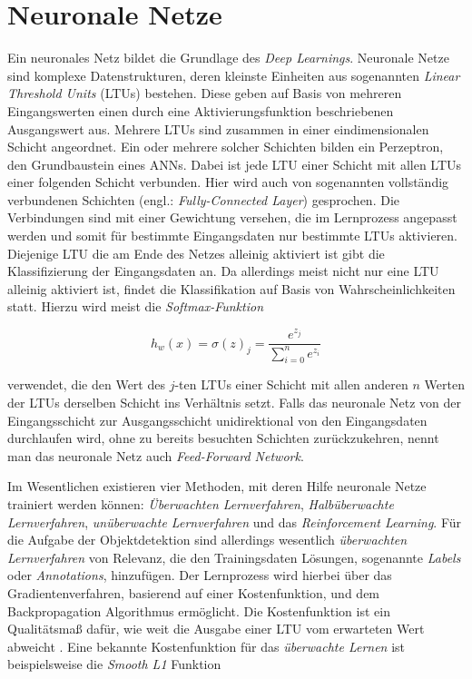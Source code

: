 \section{Neuronale Netze} \label{anns}

Ein neuronales Netz bildet die Grundlage des \textit{Deep Learnings}. Neuronale Netze sind komplexe Datenstrukturen, deren kleinste Einheiten aus sogenannten \textit{Linear Threshold Units} (LTUs) bestehen. Diese geben auf Basis von mehreren Eingangswerten einen durch eine Aktivierungsfunktion beschriebenen Ausgangswert aus. Mehrere LTUs sind zusammen in einer eindimensionalen Schicht angeordnet. Ein oder mehrere solcher Schichten bilden ein Perzeptron, den Grundbaustein eines ANNs. Dabei ist jede LTU einer Schicht mit allen LTUs einer folgenden Schicht verbunden. Hier wird auch von sogenannten vollständig verbundenen Schichten (engl.: \textit{Fully-Connected Layer}) gesprochen. Die Verbindungen sind mit einer Gewichtung versehen, die im Lernprozess angepasst werden und somit für bestimmte Eingangsdaten nur bestimmte LTUs aktivieren. Diejenige LTU die am Ende des Netzes alleinig aktiviert ist gibt die Klassifizierung der Eingangsdaten an. Da allerdings meist nicht nur eine LTU alleinig aktiviert ist, findet die Klassifikation auf Basis von Wahrscheinlichkeiten statt. Hierzu wird meist die \textit{Softmax-Funktion}

\begin{equation} \label{softmax}
h_{w}(x) = \sigma(z)_j = \frac{e^{z_j}}{\sum_{i=0}^n e^{z_i} }
\end{equation}

verwendet, die den Wert des $j$-ten LTUs einer Schicht mit allen anderen $n$ Werten der LTUs derselben Schicht ins Verhältnis setzt. Falls das neuronale Netz von der Eingangsschicht zur Ausgangsschicht unidirektional von den Eingangsdaten durchlaufen wird, ohne zu bereits besuchten Schichten zurückzukehren, nennt man das neuronale Netz auch \textit{Feed-Forward Network}.

Im Wesentlichen existieren vier Methoden, mit deren Hilfe neuronale Netze trainiert werden können: \textit{Überwachten Lernverfahren}, \textit{Halbüberwachte Lernverfahren}, \textit{unüberwachte Lernverfahren} und das \textit{Reinforcement Learning}. Für die Aufgabe der Objektdetektion sind allerdings wesentlich \textit{überwachten Lernverfahren} von Relevanz, die den Trainingsdaten Lösungen, sogenannte \textit{Labels} oder \textit{Annotations}, hinzufügen. Der Lernprozess wird hierbei über das Gradientenverfahren, basierend auf einer Kostenfunktion, und dem Backpropagation Algorithmus ermöglicht. Die Kostenfunktion ist ein Qualitätsmaß dafür, wie weit die Ausgabe einer LTU vom erwarteten Wert abweicht \cite{AurelienGeron.2018}. Eine bekannte Kostenfunktion für das \textit{überwachte Lernen} ist beispielsweise die \textit{Smooth L1} Funktion

